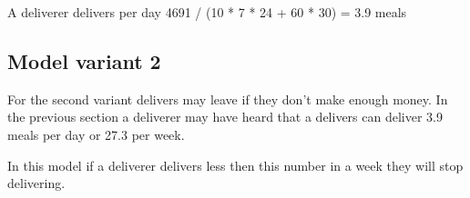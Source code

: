 A deliverer delivers per day  4691 / (10 * 7 * 24 + 60 * 30) = 3.9 meals


\subsection{Model variant 2}
For the second variant delivers may leave if they don't make enough money.
In the previous section a deliverer may have heard that a delivers can deliver 3.9 meals per day or 27.3 per week.

In this model if a deliverer delivers less then this number in a week they will stop delivering.


